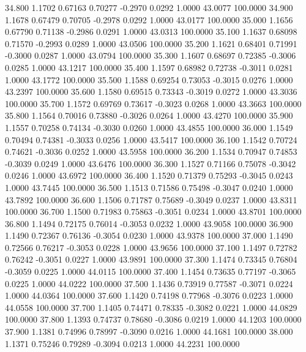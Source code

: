   34.800   1.1702   0.67163   0.70277  -0.2970   0.0292   1.0000  43.0077 100.0000
  34.900   1.1678   0.67479   0.70705  -0.2978   0.0292   1.0000  43.0177 100.0000
  35.000   1.1656   0.67790   0.71138  -0.2986   0.0291   1.0000  43.0313 100.0000
  35.100   1.1637   0.68098   0.71570  -0.2993   0.0289   1.0000  43.0506 100.0000
  35.200   1.1621   0.68401   0.71991  -0.3000   0.0287   1.0000  43.0794 100.0000
  35.300   1.1607   0.68697   0.72385  -0.3006   0.0285   1.0000  43.1217 100.0000
  35.400   1.1597   0.68982   0.72738  -0.3011   0.0281   1.0000  43.1772 100.0000
  35.500   1.1588   0.69254   0.73053  -0.3015   0.0276   1.0000  43.2397 100.0000
  35.600   1.1580   0.69515   0.73343  -0.3019   0.0272   1.0000  43.3036 100.0000
  35.700   1.1572   0.69769   0.73617  -0.3023   0.0268   1.0000  43.3663 100.0000
  35.800   1.1564   0.70016   0.73880  -0.3026   0.0264   1.0000  43.4270 100.0000
  35.900   1.1557   0.70258   0.74134  -0.3030   0.0260   1.0000  43.4855 100.0000
  36.000   1.1549   0.70494   0.74381  -0.3033   0.0256   1.0000  43.5417 100.0000
  36.100   1.1542   0.70724   0.74621  -0.3036   0.0252   1.0000  43.5958 100.0000
  36.200   1.1534   0.70947   0.74853  -0.3039   0.0249   1.0000  43.6476 100.0000
  36.300   1.1527   0.71166   0.75078  -0.3042   0.0246   1.0000  43.6972 100.0000
  36.400   1.1520   0.71379   0.75293  -0.3045   0.0243   1.0000  43.7445 100.0000
  36.500   1.1513   0.71586   0.75498  -0.3047   0.0240   1.0000  43.7892 100.0000
  36.600   1.1506   0.71787   0.75689  -0.3049   0.0237   1.0000  43.8311 100.0000
  36.700   1.1500   0.71983   0.75863  -0.3051   0.0234   1.0000  43.8701 100.0000
  36.800   1.1494   0.72175   0.76014  -0.3053   0.0232   1.0000  43.9058 100.0000
  36.900   1.1490   0.72367   0.76136  -0.3054   0.0230   1.0000  43.9378 100.0000
  37.000   1.1490   0.72566   0.76217  -0.3053   0.0228   1.0000  43.9656 100.0000
  37.100   1.1497   0.72782   0.76242  -0.3051   0.0227   1.0000  43.9891 100.0000
  37.300   1.1474   0.73345   0.76804  -0.3059   0.0225   1.0000  44.0115 100.0000
  37.400   1.1454   0.73635   0.77197  -0.3065   0.0225   1.0000  44.0222 100.0000
  37.500   1.1436   0.73919   0.77587  -0.3071   0.0224   1.0000  44.0364 100.0000
  37.600   1.1420   0.74198   0.77968  -0.3076   0.0223   1.0000  44.0558 100.0000
  37.700   1.1405   0.74471   0.78335  -0.3082   0.0221   1.0000  44.0829 100.0000
  37.800   1.1393   0.74737   0.78680  -0.3086   0.0219   1.0000  44.1203 100.0000
  37.900   1.1381   0.74996   0.78997  -0.3090   0.0216   1.0000  44.1681 100.0000
  38.000   1.1371   0.75246   0.79289  -0.3094   0.0213   1.0000  44.2231 100.0000
